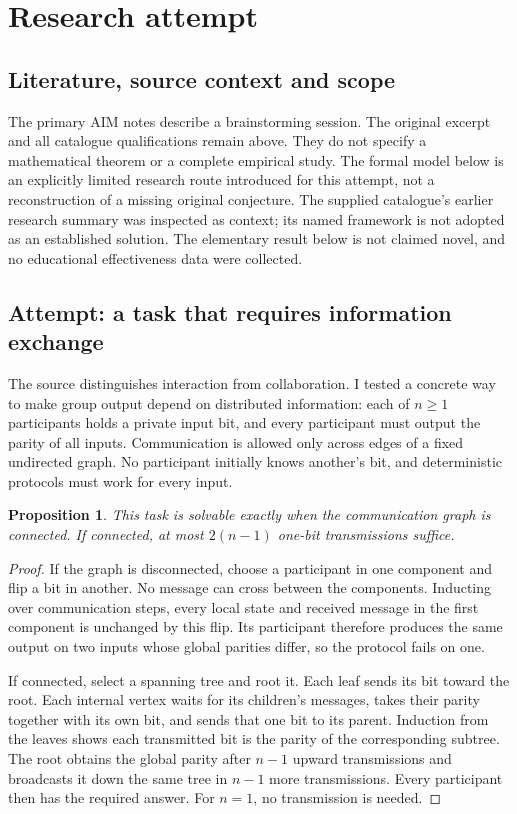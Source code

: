 \documentclass[11pt]{article}
\newtheorem{proposition}{Proposition}
\begin{document}
\section{Research attempt}
\subsection{Literature, source context and scope}
The primary AIM notes describe a brainstorming session. The original excerpt and all catalogue qualifications remain above. They do not specify a mathematical theorem or a complete empirical study. The formal model below is an explicitly limited research route introduced for this attempt, not a reconstruction of a missing original conjecture. The supplied catalogue's earlier research summary was inspected as context; its named framework is not adopted as an established solution. The elementary result below is not claimed novel, and no educational effectiveness data were collected.

\subsection{Attempt: a task that requires information exchange}
The source distinguishes interaction from collaboration. I tested a concrete way to make group output depend on distributed information: each of $n\ge1$ participants holds a private input bit, and every participant must output the parity of all inputs. Communication is allowed only across edges of a fixed undirected graph. No participant initially knows another's bit, and deterministic protocols must work for every input.
\begin{proposition}
This task is solvable exactly when the communication graph is connected. If connected, at most $2(n-1)$ one-bit transmissions suffice.
\end{proposition}
\begin{proof}
If the graph is disconnected, choose a participant in one component and flip a bit in another. No message can cross between the components. Inducting over communication steps, every local state and received message in the first component is unchanged by this flip. Its participant therefore produces the same output on two inputs whose global parities differ, so the protocol fails on one.

If connected, select a spanning tree and root it. Each leaf sends its bit toward the root. Each internal vertex waits for its children's messages, takes their parity together with its own bit, and sends that one bit to its parent. Induction from the leaves shows each transmitted bit is the parity of the corresponding subtree. The root obtains the global parity after $n-1$ upward transmissions and broadcasts it down the same tree in $n-1$ more transmissions. Every participant then has the required answer. For $n=1$, no transmission is needed.
\end{proof}
\end{document}
